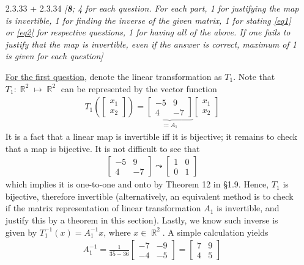 \documentclass{amsart}
\theoremstyle{definition}
\theoremstyle{definition}
\DeclareMathOperator{\R}{\mathbb{R}}
\DeclareMathOperator{\1}{\mathbbm{1}}
\begin{document}
\begin{enumerate}[itemsep = 2mm]
		
		
		
		\item[2.3.33 + 2.3.34] \textit{[\textbf{8}; 4 for each question. For each part, 1 for justifying the map is invertible, 1 for finding the inverse of the given matrix, 1 for stating \eqref{eq1} or \eqref{eq2} for respective questions, 1 for having all of the above. If one fails to justify that the map is invertible, even if the answer is correct, maximum of 1 is given for each question]}
		
		
		\uline{For the first question}, denote the linear transformation as $T_1$. Note that $T_1 : \R^2 \mapsto \R^2$ can be represented by the vector function
		\begin{align*}
		T_1 \left( \begin{bmatrix} x_1 \\ x_2 \end{bmatrix} \right) = \underbrace{ \begin{bmatrix} -5 & 9 \\ 4 & -7 \end{bmatrix} }_{\coloneqq A_1} \begin{bmatrix} x_1 \\ x_2 \end{bmatrix}
		\end{align*}
		It is a fact that a linear map is invertible iff it is bijective; it remains to check that a map is bijective. It is not difficult to see that
		\begin{align*}
		\begin{bmatrix} -5 & 9 \\ 4 & -7 \end{bmatrix} \leadsto \begin{bmatrix} 1 & 0 \\ 0 & 1 \end{bmatrix}
		\end{align*}
		which implies it is one-to-one and onto by Theorem 12 in \S1.9. Hence, $T_1$ is bijective, therefore invertible (alternatively, an equivalent method is to check if the matrix representation of linear transformation $A_1$ is invertible, and justify this by a theorem in this section). Lastly, we know such inverse is given by $T_1^{-1} (x) = A_1^{-1} x$, where $x \in \R^2$. A simple calculation yields
		\begin{align*}
		A_1^{-1} = \frac{1}{35 -36} \begin{bmatrix} -7 & -9 \\ -4 & -5 \end{bmatrix} = \begin{bmatrix} 7 & 9 \\ 4 & 5 \end{bmatrix} 

\end{align*}
\end{enumerate}
\end{document}
